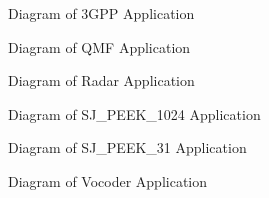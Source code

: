 \begin{figure}
\centering {} \caption{Diagram of
3GPP Application}
\end{figure}

\begin{figure}
\centering {} \caption{Diagram of
QMF Application}
\end{figure}

\begin{figure}
\centering {} \caption{Diagram of
Radar Application}
\end{figure}

\begin{figure}
\centering {} \caption{Diagram of
SJ\_PEEK\_1024 Application}
\end{figure}

\begin{figure}
\centering {} \caption{Diagram of
SJ\_PEEK\_31 Application}
\end{figure}

\begin{figure}
\centering {} \caption{Diagram
of Vocoder Application}
\end{figure}
